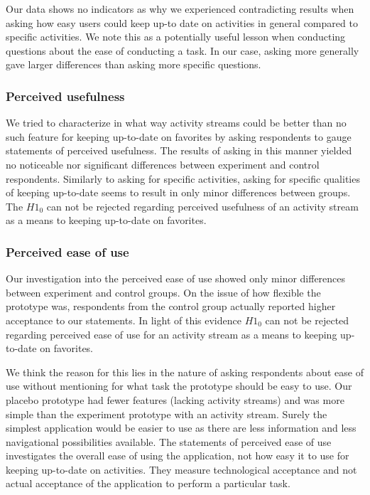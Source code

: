 Our data shows no indicators as why we experienced contradicting results
when asking how easy users could keep up-to date on activities in general
compared to specific activities. We note this as a potentially useful lesson
when conducting questions about the ease of conducting a task. In our case,
asking more generally gave larger differences than asking more specific
questions.

\subsubsection{Perceived usefulness}

We tried to characterize in what way activity streams could be better than
no such feature for keeping up-to-date on favorites by asking respondents
to gauge statements of perceived usefulness.%
The results of asking in this manner yielded no noticeable nor significant
differences between experiment and control respondents. Similarly to asking
for specific activities, asking for specific qualities of keeping up-to-date
seems to result in only minor differences between groups.
The $H1_0$ can
not be rejected regarding perceived usefulness of an activity
stream as a means to keeping up-to-date on favorites.

\subsubsection{Perceived ease of use}

Our investigation into the perceived ease of use%
showed only minor differences between experiment and control groups. On the
issue of how flexible the prototype was, respondents from the control group
actually reported higher acceptance to our statements.
In light of this evidence $H1_0$ can
not be rejected regarding perceived ease of use for an activity
stream as a means to keeping up-to-date on favorites.

We think the reason for
this lies in the nature of asking respondents about ease of use without
mentioning for what task the prototype should be easy to use. Our placebo
prototype had fewer features (lacking activity streams) and was more simple
than the experiment prototype with an activity stream. Surely the simplest
application would be easier to use as there are less information and less
navigational possibilities available. The statements of perceived ease of use
investigates the overall ease of using the application, not how easy it to use
for keeping up-to-date on activities. They measure technological acceptance
and not actual acceptance of the application to perform a particular task.


